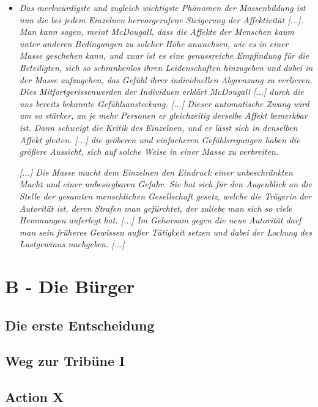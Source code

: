 \documentclass[a4paper, 12pt]{report}
\begin{document}
\begin{itemize}
    \item[] \textit{Das merkwürdigste und zugleich wichtigste Phänomen der Massenbildung ist nun die bei jedem Einzelnen hervorgerufene Steigerung der Affektivität [...].
    Man kann sagen, meint McDougall, dass die Affekte der Menschen kaum unter anderen Bedingungen zu solcher Höhe anwachsen, wie es in einer Masse geschehen kann, und zwar ist es eine genussreiche Empfindung für die Beteiligten, sich so schrankenlos ihren Leidenschaften hinzugeben und dabei in der Masse aufzugehen, das Gefühl ihrer individuellen Abgrenzung zu verlieren.
    Dies Mitfortgerissenwerden der Individuen erklärt McDougall [...] durch die uns bereits bekannte Gefühlsansteckung. [...]
    Dieser automatische Zwang wird um so stärker, an je mehr Personen er gleichzeitig derselbe Affekt bemerkbar ist.
    Dann schweigt die Kritik des Einzelnen, und er lässt sich in denselben Affekt gleiten. [...]
    die gröberen und einfacheren Gefühlsregungen haben die größere Aussicht, sich auf solche Weise in einer Masse zu verbreiten.}

    \textit{[...] Die Masse macht dem Einzelnen den Eindruck einer unbeschränkten Macht und einer unbesiegbaren Gefahr.
    Sie hat sich für den Augenblick an die Stelle der gesamten menschlichen Gesellschaft gesetz, welche die Trägerin der Autorität ist, deren Strafen man gefürchtet, der zuliebe man sich so viele Hemmungen auferlegt hat.
    [...] Im Gehorsam gegen die neue Autorität darf man sein früheres \glqq Gewissen\grqq{} außer Tätigkeit setzen und dabei der Lockung des Lustgewinns nachgeben. [...]}
\end{itemize}
    

\section{B - Die Bürger}

\subsection{Die erste Entscheidung}

\subsection{Weg zur Tribüne I}

\subsection{Action X}
\end{document}
